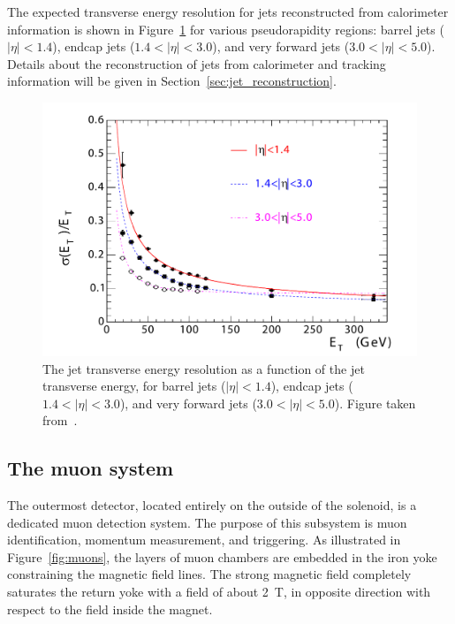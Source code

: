 The expected transverse energy resolution for jets reconstructed from calorimeter information is shown in Figure~\ref{fig:JER} for various pseudorapidity regions: barrel jets ($|\eta| < 1.4$), endcap jets ($1.4 < |\eta| < 3.0$), and very forward jets ($3.0 < |\eta| < 5.0$). Details about the reconstruction of jets from calorimeter and tracking information will be given in Section~\ref{sec:jet_reconstruction}.

\begin{figure}[ht]
  \centering
 \includegraphics[width=.6\textwidth]{JER}
 \caption{The jet transverse energy resolution as a function of the jet transverse energy, for barrel jets ($|\eta| < 1.4$), endcap jets ($1.4 < |\eta| < 3.0$), and very forward jets ($3.0 < |\eta| < 5.0$). Figure taken from~\cite{Chatrchyan:2008aa}.}
 \label{fig:JER}
\end{figure}

\subsection{The muon system}

The outermost detector, located entirely on the outside of the solenoid, is a dedicated muon detection system. The purpose of this subsystem is muon identification, momentum measurement, and triggering. As illustrated in Figure~\ref{fig:muons}, the layers of muon chambers are embedded in the iron yoke constraining the magnetic field lines. The strong magnetic field completely saturates the return yoke with a field of about \SI{2}{T}, in opposite direction with respect to the field inside the magnet.

